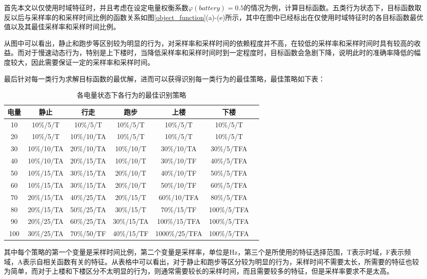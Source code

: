 \par 首先本文以仅使用时域特征时，并且考虑在设定电量权衡系数$\varphi (battery) = 0.5$的情况为例，计算目标函数。五类行为状态下，目标函数取反以后与采样率的和采样时间比例的函数关系如图\ref{object_function}(a)-(e)所示，其中在图中已经标出在仅使用时域特征时的各目标函数最优值以及其最佳采样率和采样时间比例。
\par 从图中可以看出，静止和跑步等区别较为明显的行为，对采样率和采样时间的依赖程度并不高，在较低的采样率和采样时间时具有较高的收益。而对于慢速动态行为，特别是上下楼时，当降低采样率和采样时间时到一定程度时，目标函数会急剧下降，说明此时的准确率降低的幅度较大，因此需要保证一定的采样率和采样时间。
\par 最后针对每一类行为求解目标函数的最优解，进而可以获得识别每一类行为的最佳策略，最佳策略如下表：
\begin{table}[htb]
    \centering
    \caption{各电量状态下各行为的最佳识别策略}
    \begin{tabular}{ccccccc}
    \toprule
    电量 & 静止 & 行走 & 跑步 & 上楼 & 下楼 \\
    \midrule
    10 & 10\%/5/T & 10\%/5/T & 10\%/5/T & 10\%/5/T & 10\%/5/T \\
    20 & 10\%/5/T & 10\%/10/TA & 10\%/5/T & 10\%/5/T & 10\%/5/T \\
    30 & 10\%/10/TA & 20\%/10/TA & 10\%/10/T & 30\%/10/TA & 30\%/5/TFA \\
    40 & 10\%/10/TA & 20\%/15/TA & 10\%/10/T & 30\%/10/TF & 40\%/5/TFA \\
    50 & 10\%/15/TA & 30\%/15/TA & 20\%/10/T & 40\%/10/TF & 50\%/5/TFA \\
    60 & 10\%/15/TA & 30\%/15/TA & 20\%/10/T & 50\%/10/TF & 60\%/5/TFA \\
    70 & 20\%/15/TA & 40\%/25/TA & 20\%/15/T & 60\%/10/TFA & 80\%/5/TFA \\
    80 & 20\%/15/TA & 50\%/25/TA & 30\%/15/T & 70\%/15/TF & 100\%/5/TFA \\
    90 & 20\%/25/TA & 60\%/25/TA & 30\%/15/TA & 100\%/15/TFA & 100\%/5/TFA \\
    100 & 30\%/25/TA & 70\%/50/TF & 40\%/15/TF & 1000\%/25/TFA & 100\%/5/TFA \\
    \bottomrule
    \end{tabular}
\end{table}

\par 其中每个策略的第一个变量是采样时间比例，第二个变量是采样率，单位是Hz，第三个是所使用的特征选择范围，T表示时域，F表示频域，A表示自相关函数有关的特征。从表格中可以看出，对于静止和跑步等区分较为明显的行为，采样时间不需要太长，所需要的特征也较为简单，而对于上楼和下楼区分不太明显的行为，则通常需要较长的采样时间，而且需要较多的特征，但是采样率要求不是太高。

